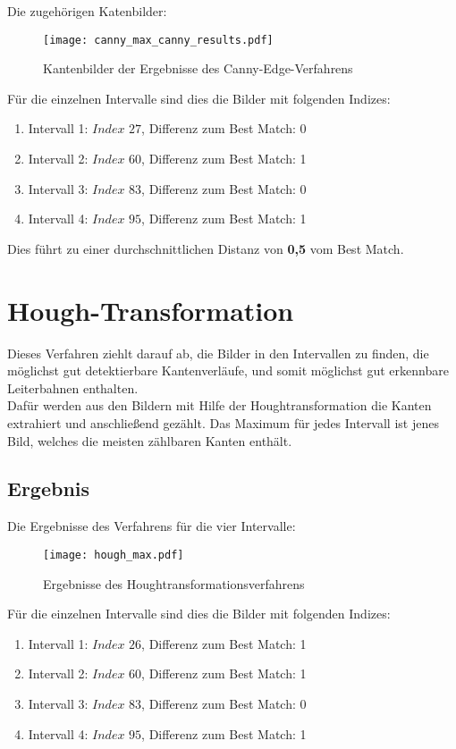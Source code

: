 Die zugehörigen Katenbilder:
\begin{figure}[H]
  \begin{center}
    \texttt{[image: canny\_max\_canny\_results.pdf]}
    \caption{Kantenbilder der Ergebnisse des Canny-Edge-Verfahrens}
    \label{fig:canny_max_bestmatch4}
  \end{center}
\end{figure}

Für die einzelnen Intervalle sind dies die Bilder mit folgenden Indizes:
\begin{enumerate}
	\item{Intervall 1: $Index$ $27$, Differenz zum Best Match: 0}
	\item{Intervall 2: $Index$ $60$, Differenz zum Best Match: 1}
	\item{Intervall 3: $Index$ $83$, Differenz zum Best Match: 0}
	\item{Intervall 4: $Index$ $95$, Differenz zum Best Match: 1}
\end{enumerate}

Dies führt zu einer durchschnittlichen Distanz von \textbf{0,5} vom Best Match.


\section{Hough-Transformation}
Dieses Verfahren ziehlt darauf ab, die Bilder in den Intervallen zu finden, die möglichst gut detektierbare Kantenverläufe, und somit möglichst gut erkennbare Leiterbahnen enthalten. \\
Dafür werden aus den Bildern mit Hilfe der Houghtransformation die Kanten extrahiert und anschließend gezählt. Das Maximum für jedes Intervall ist jenes Bild, welches die meisten zählbaren Kanten enthält.

\subsection{Ergebnis} 

Die Ergebnisse des Verfahrens für die vier Intervalle:
\begin{figure}[H]
  \begin{center}
    \texttt{[image: hough\_max.pdf]}
    \caption{Ergebnisse des Houghtransformationsverfahrens}
    \label{fig:hough_bestmatch4}
  \end{center}
\end{figure}

Für die einzelnen Intervalle sind dies die Bilder mit folgenden Indizes:
\begin{enumerate}
	\item{Intervall 1: $Index$ $26$, Differenz zum Best Match: 1}
	\item{Intervall 2: $Index$ $60$, Differenz zum Best Match: 1}
	\item{Intervall 3: $Index$ $83$, Differenz zum Best Match: 0}
	\item{Intervall 4: $Index$ $95$, Differenz zum Best Match: 1}
\end{enumerate}

